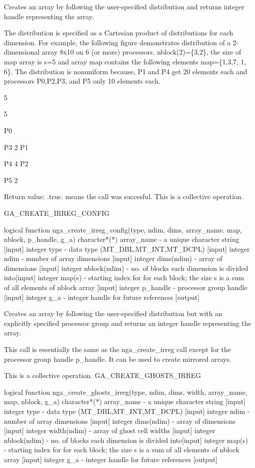 Creates an array by following the user-specified distribution and
returns integer handle representing the array.

The distribution is specified as a Cartesian product of distributions
for each dimension. For example, the following figure demonstrates
distribution of a 2-dimensional array 8x10 on 6 (or more) processors.
nblock(2)=\{3,2\}, the size of map array is s=5 and array map contains
the following elements map=\{1,3,7, 1, 6\}. The distribution is nonuniform
because, P1 and P4 get 20 elements each and processors P0,P2,P3, and
P5 only 10 elements each. 

5 

5 

P0 

P3 2 P1 

P4 4 P2 

P5 2

Return value: .true. means the call was succesful. This is a collective
operation.

GA\_CREATE\_IRREG\_CONFIG

logical function nga\_create\_irreg\_config(type, ndim, dims, array\_name,
map, nblock, p\_handle, g\_a) character{*}({*}) array\_name - a unique
character string {[}input{]} integer type - data type (MT\_DBL,MT\_INT,MT\_DCPL)
{[}input{]} integer ndim - number of array dimensions {[}input{]}
integer dims(ndim) - array of dimensions {[}input{]} integer nblock(ndim)
- no. of blocks each dimension is divided into{[}input{]} integer
map(s) - starting index for for each block; the size s is a sum of
all elements of nblock array {[}input{]} integer p\_handle - processor
group handle {[}input{]} integer g\_a - integer handle for future
references {[}output{]}

Creates an array by following the user-specified distribution but
with an explicitly specified processor group and returns an integer
handle representing the array.

This call is essentially the same as the nga\_create\_irreg call except
for the processor group handle p\_handle. It can be used to create
mirrored arrays.

This is a collective operation. GA\_CREATE\_GHOSTS\_IRREG

logical function nga\_create\_ghosts\_irreg(type, ndim, dims, width,
array\_name, map, nblock, g\_a) character{*}({*}) array\_name - a
unique character string {[}input{]} integer type - data type (MT\_DBL,MT\_INT,MT\_DCPL)
{[}input{]} integer ndim - number of array dimensions {[}input{]}
integer dims(ndim) - array of dimensions {[}input{]} integer width(ndim)
- array of ghost cell widths {[}input{]} integer nblock(ndim) - no.
of blocks each dimension is divided into{[}input{]} integer map(s)
- starting index for for each block; the size s is a sum of all elements
of nblock array {[}input{]} integer g\_a - integer handle for future
references {[}output{]}

